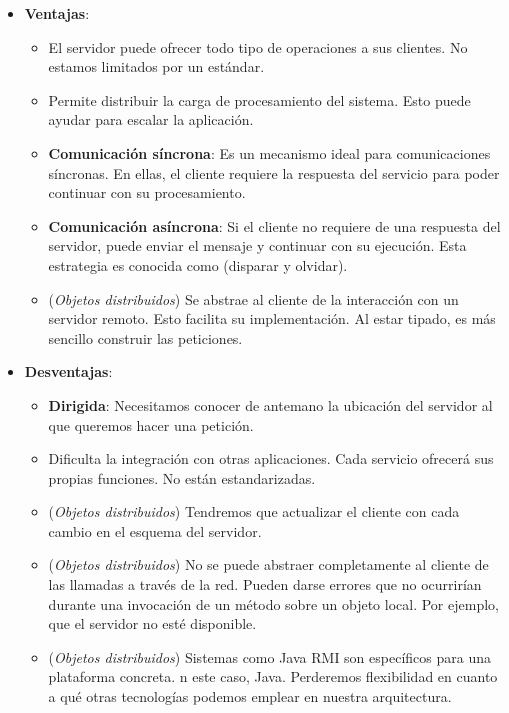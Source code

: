 \begin{itemize}
  \item \textbf{Ventajas}:
  \begin{itemize}
    \item El servidor puede ofrecer todo tipo de operaciones a sus clientes. No estamos limitados por un estándar.

    \item Permite distribuir la carga de procesamiento del sistema. Esto puede ayudar para escalar la aplicación.

    \item \textbf{Comunicación síncrona}: Es un mecanismo ideal para comunicaciones síncronas. En ellas, el cliente requiere la respuesta del servicio para poder continuar con su procesamiento.

    \item \textbf{Comunicación asíncrona}: Si el cliente no requiere de una respuesta del servidor, puede enviar el mensaje y continuar con su ejecución. Esta estrategia es conocida como  (disparar y olvidar).

    \item (\emph{Objetos distribuidos}) Se abstrae al cliente de la interacción con un servidor remoto. Esto facilita su implementación. Al estar tipado, es más sencillo construir las peticiones.

  \end{itemize}

  \item \textbf{Desventajas}:
  \begin{itemize}
    \item \textbf{Dirigida}: Necesitamos conocer de antemano la ubicación del servidor al que queremos hacer una petición.

    \item Dificulta la integración con otras aplicaciones. Cada servicio ofrecerá sus propias funciones. No están estandarizadas.

    \item (\emph{Objetos distribuidos}) Tendremos que actualizar el cliente con cada cambio en el esquema del servidor.

    \item (\emph{Objetos distribuidos}) No se puede abstraer completamente al cliente de las llamadas a través de la red. Pueden darse errores que no ocurrirían durante una invocación de un método sobre un objeto local. Por ejemplo, que el servidor no esté disponible. \cite{jausovecFallaciesDistributedSystems2020}

    \item (\emph{Objetos distribuidos}) Sistemas como Java RMI son específicos para una plataforma concreta. n este caso, Java. Perderemos flexibilidad en cuanto a qué otras tecnologías podemos emplear en nuestra arquitectura. \cite{newmanBuildingMicroservicesDesigning2021}
  \end{itemize}
\end{itemize}


